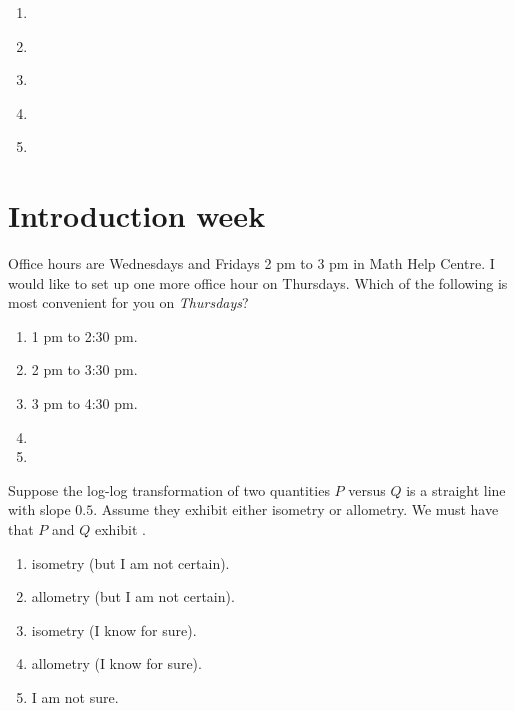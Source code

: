 \documentclass[aspectratio=169, t, 14pt]{beamer}
\begin{document}
 

\begin{frame}[c]
  \thispagestyle{empty}

  \begin{enumerate} 
    \item \underline{\hspace{4in}}
    \item \underline{\hspace{4in}}
    \item \underline{\hspace{4in}}
    \item \underline{\hspace{4in}}
    \item \underline{\hspace{4in}}
  \end{enumerate} 
\end{frame}

\section{Introduction week}

\begin{frame}[t]
  Office hours are Wednesdays and Fridays 2 pm to 3 pm in Math Help Centre.  I would like to set up one more office hour on Thursdays. Which of the following is most convenient for you on \emph{Thursdays}?

  \begin{enumerate} 
    \item 1 pm to 2:30 pm.
    \item 2 pm to 3:30 pm.
    \item 3 pm to 4:30 pm.
    \item 
    \item 
  \end{enumerate} 
\end{frame}


\begin{frame}[t]
  Suppose the log-log transformation of two quantities \(P\) versus \(Q\) is a straight line with slope \(0.5\).  Assume they exhibit either isometry or allometry. We must have that \(P\) and \(Q\) exhibit \underline{\hspace{1in}}.  

  \begin{enumerate} 
    \item isometry (but I am not certain).
    \item allometry (but I am not certain).
    \item isometry (I know for sure).
    \item allometry (I know for sure).
    \item I am not sure.
  \end{enumerate} 
\end{frame}
\end{document}
